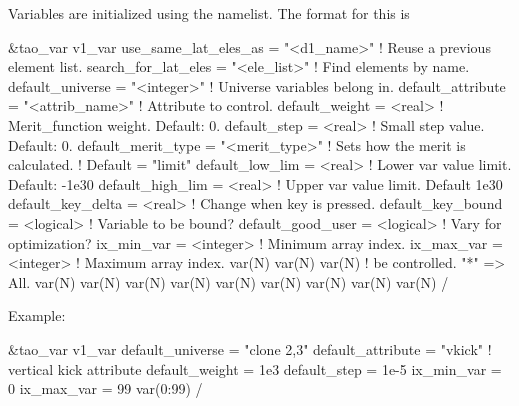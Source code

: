 {{{{{{{{{{{Variables are initialized using the  namelist. The format for this is
\begin{example}
  &tao_var
    v1_var%
    use_same_lat_eles_as = "<d1_name>"     ! Reuse a previous element list.
    search_for_lat_eles  = "<ele_list>"    ! Find elements by name.
    default_universe     = "<integer>"     ! Universe variables belong in.
    default_attribute    = "<attrib_name>" ! Attribute to control.
    default_weight       = <real>          ! Merit_function weight. Default: 0.
    default_step         = <real>          ! Small step value. Default: 0.
    default_merit_type   = "<merit_type>"  ! Sets how the merit is calculated.
                                           !   Default = "limit"
    default_low_lim      = <real>          ! Lower var value limit. Default: -1e30
    default_high_lim     = <real>          ! Upper var value limit. Default 1e30
    default_key_delta    = <real>          ! Change when key is pressed.
    default_key_bound    = <logical>       ! Variable  to be bound?
    default_good_user    = <logical>       ! Vary for optimization?
    ix_min_var           = <integer>       ! Minimum array index.
    ix_max_var           = <integer>       ! Maximum array index.
    var(N)%
    var(N)%
    var(N)%
                                           !    be controlled. "*" => All.
    var(N)%
    var(N)%
    var(N)%
    var(N)%
    var(N)%
    var(N)%
    var(N)%
    var(N)%
    var(N)%
  /
\end{example}
Example:
\begin{example}
  &tao_var
    v1_var%
    default_universe  = "clone 2,3"
    default_attribute = "vkick"     ! vertical kick attribute
    default_weight    = 1e3
    default_step      = 1e-5
    ix_min_var        = 0
    ix_max_var        = 99
    var(0:99)%
  /
\end{example}

}}}}}}}}}}}
